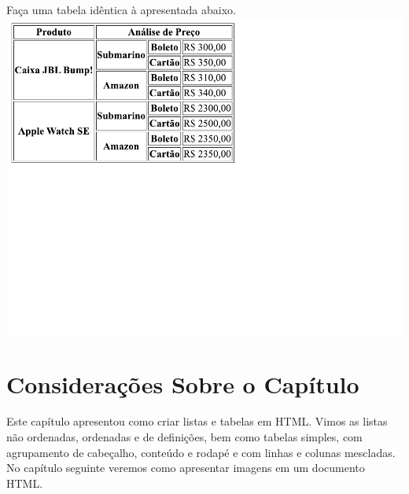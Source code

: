 \begin{exercise}
Faça uma tabela idêntica à apresentada abaixo. \\
\includegraphics[width=.5\textwidth, trim={0 6.85cm 7cm 0}]{Images/chapter04/html_ex_table_03.pdf}     
\end{exercise}

\section{Considerações Sobre o Capítulo}

Este capítulo apresentou como criar listas e tabelas em HTML. Vimos as listas não ordenadas, ordenadas e de definições, bem como tabelas simples, com agrupamento de cabeçalho, conteúdo e rodapé e com linhas e colunas mescladas. No capítulo seguinte veremos como apresentar imagens em um documento HTML.